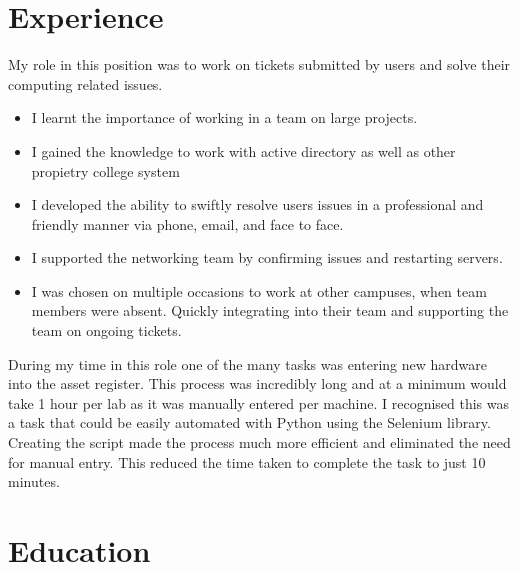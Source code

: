 \documentclass[a4paper]{cv}
\begin{document}
\hspace{0.1cm}
{\color{headings}\vrule}
\hspace{0.1cm}
\begin{minipage}[t]{0.70\textwidth}
\section{Experience}
My role in this position was to work on tickets submitted by users and solve their computing related issues.
\begin{itemize}
    \item I learnt the importance of working in a team on large projects.
    \item I gained the knowledge to work with active directory as well as other propietry college system
    \item I developed the ability to swiftly resolve users issues in a professional and friendly manner via phone, email, and face to face.
    \item I supported the networking team by confirming issues and restarting servers.
    \item I was chosen on multiple occasions to work at other campuses, when team members were absent. Quickly integrating into their team and supporting the team on ongoing tickets.
\end{itemize}
During my time in this role one of the many tasks was entering new hardware into the asset register. This process was incredibly long and at a minimum would take 1 hour per lab as it was manually entered per machine. I recognised this was a task that could be easily automated with Python using the Selenium library. Creating the script made the process much more efficient and eliminated the need for manual entry. This reduced the time taken to complete the task to just 10 minutes.
\section{Education}
\sectionspace

\sectionspace

 

\end{minipage}
\end{document}
